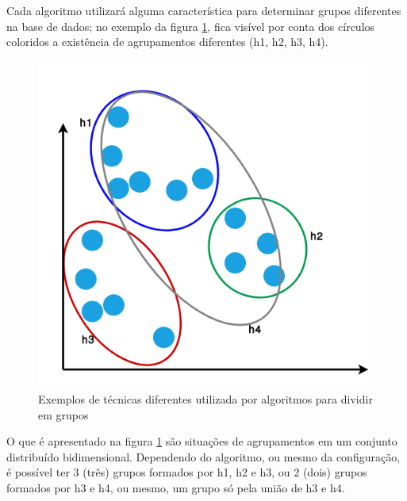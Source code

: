 Cada algoritmo utilizará alguma característica para determinar grupos diferentes na base de dados; no exemplo da figura \ref{fig:planoCartesianoAprendNSup}, fica visível por conta dos círculos coloridos a existência de agrupamentos diferentes (h1, h2, h3, h4). 

\begin{figure}[h!]
    \centering
    \includegraphics[scale=0.4]{figs/amostra_dados_AprendNSuperv.png}
    
    
    \caption{Exemplos de técnicas diferentes utilizada por algoritmos para dividir em grupos} 
    \label{fig:planoCartesianoAprendNSup}     
\end{figure}


 

O que é apresentado na figura \ref{fig:planoCartesianoAprendNSup} são situações de agrupamentos em um conjunto distribuído bidimensional. Dependendo do algoritmo, ou mesmo da configuração, é possível ter 3 (três) grupos formados por h1, h2 e h3, ou 2 (dois) grupos formados por h3 e h4, ou mesmo, um grupo só pela união de h3 e h4. 

